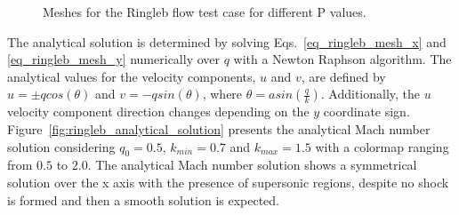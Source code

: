 \begin{figure}[H]
{		\label{fig:ringleb_mesh_2_cp}
    }
    \caption{Meshes for the Ringleb flow test case for different P values.}
    \label{fig:ringleb_meshes}
\end{figure}

The analytical solution is determined by solving Eqs.\ \ref{eq_ringleb_mesh_x} and \ref{eq_ringleb_mesh_y} numerically  over $q$ with a Newton Raphson algorithm. The analytical values for the velocity components, $u$ and $v$, are defined by $u = \pm q cos(\theta)$ and $v = -q sin(\theta)$, where $\theta = asin \left(\frac{q}{k}\right)$. Additionally, the $u$ velocity component direction changes depending on the $y$ coordinate sign. Figure\ \ref{fig:ringleb_analytical_solution} presents the analytical Mach number solution considering $q_0=0.5$, $k_{min}=0.7$ and $k_{max}=1.5$ with a colormap ranging from $0.5$ to $2.0$. The analytical Mach number solution shows a symmetrical solution over the x axis with the presence of supersonic regions, despite no shock is formed and then a smooth solution is expected.

